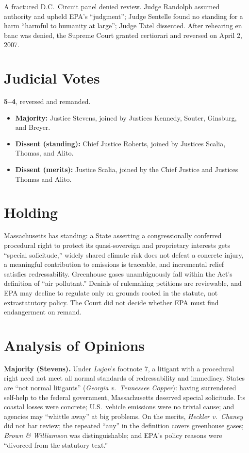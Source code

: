 \documentclass[12pt]{article}
\begin{document}
A fractured D.C.\ Circuit panel denied review. Judge Randolph assumed authority and upheld EPA's ``judgment''; Judge Sentelle found no standing for a harm ``harmful to humanity at large''; Judge Tatel dissented. After rehearing en banc was denied, the Supreme Court granted certiorari and reversed on April 2, 2007.

\section{Judicial Votes}

\textbf{5--4}, reversed and remanded.
\begin{itemize}
\item \textbf{Majority:} Justice Stevens, joined by Justices Kennedy, Souter, Ginsburg, and Breyer.
\item \textbf{Dissent (standing):} Chief Justice Roberts, joined by Justices Scalia, Thomas, and Alito.
\item \textbf{Dissent (merits):} Justice Scalia, joined by the Chief Justice and Justices Thomas and Alito.
\end{itemize}

\section{Holding}

Massachusetts has standing: a State asserting a congressionally conferred procedural right to protect its quasi-sovereign and proprietary interests gets ``special solicitude,'' widely shared climate risk does not defeat a concrete injury, a meaningful contribution to emissions is traceable, and incremental relief satisfies redressability. Greenhouse gases unambiguously fall within the Act's definition of ``air pollutant.'' Denials of rulemaking petitions are reviewable, and EPA may decline to regulate only on grounds rooted in the statute, not extrastatutory policy. The Court did not decide whether EPA must find endangerment on remand.

\section{Analysis of Opinions}

\textbf{Majority (Stevens).} Under \textit{Lujan}'s footnote 7, a litigant with a procedural right need not meet all normal standards of redressability and immediacy. States are ``not normal litigants'' (\textit{Georgia v.\ Tennessee Copper}): having surrendered self-help to the federal government, Massachusetts deserved special solicitude. Its coastal losses were concrete; U.S.\ vehicle emissions were no trivial cause; and agencies may ``whittle away'' at big problems. On the merits, \textit{Heckler v.\ Chaney} did not bar review; the repeated ``any'' in the definition covers greenhouse gases; \textit{Brown \& Williamson} was distinguishable; and EPA's policy reasons were ``divorced from the statutory text.''
\end{document}
